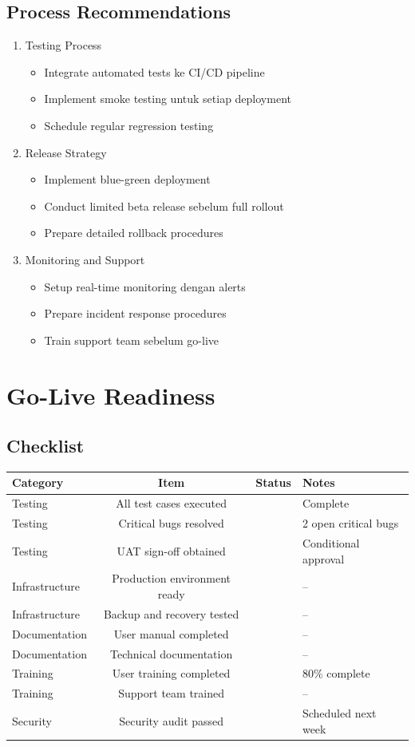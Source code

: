 \documentclass[12pt,a4paper]{article}
\newcommand{\cmark}{\ding{51}}
\newcommand{\xmark}{\ding{55}}
\newcommand{\warn}{\ding{115}}
\begin{document}
\subsection{Process Recommendations}
\begin{enumerate}
  \item Testing Process
  \begin{itemize}
    \item Integrate automated tests ke CI/CD pipeline
    \item Implement smoke testing untuk setiap deployment
    \item Schedule regular regression testing
  \end{itemize}
  \item Release Strategy
  \begin{itemize}
    \item Implement blue-green deployment
    \item Conduct limited beta release sebelum full rollout
    \item Prepare detailed rollback procedures
  \end{itemize}
  \item Monitoring and Support
  \begin{itemize}
    \item Setup real-time monitoring dengan alerts
    \item Prepare incident response procedures
    \item Train support team sebelum go-live
  \end{itemize}
\end{enumerate}

\section{Go-Live Readiness}
\subsection{Checklist}
\begin{tabularx}{\textwidth}{@{}lclX@{}}
\toprule
Category & Item & Status & Notes \\
\midrule
Testing & All test cases executed & \cmark & Complete \\
Testing & Critical bugs resolved & \xmark & 2 open critical bugs \\
Testing & UAT sign-off obtained & \warn & Conditional approval \\
Infrastructure & Production environment ready & \cmark & -- \\
Infrastructure & Backup and recovery tested & \cmark & -- \\
Documentation & User manual completed & \cmark & -- \\
Documentation & Technical documentation & \cmark & -- \\
Training & User training completed & \warn & 80\% complete \\
Training & Support team trained & \cmark & -- \\
Security & Security audit passed & \xmark & Scheduled next week \\
\bottomrule
\end{tabularx}
\end{document}
